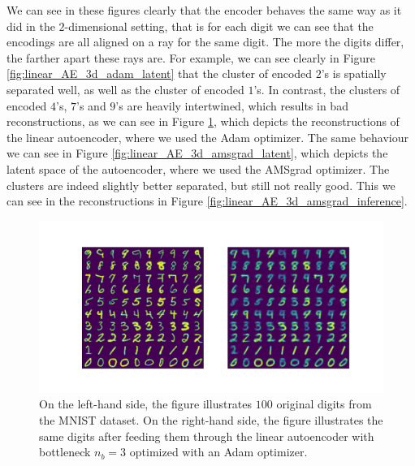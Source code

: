 We can see in these figures clearly that the encoder behaves the same way as it did in the $2$-dimensional setting, that is for each digit we can see that the encodings are all aligned on a ray for the same digit. The more the digits differ, the farther apart these rays are. For example, we can see clearly in Figure \ref{fig:linear_AE_3d_adam_latent} that the cluster of encoded $2$'s is spatially separated well, as well as the cluster of encoded $1$'s. In contrast, the clusters of encoded $4$'s, $7$'s and $9$'s are heavily intertwined, which results in bad reconstructions, as we can see in Figure \ref{fig:linear_AE_3d_adam_inference}, which depicts the reconstructions of the linear autoencoder, where we used the Adam optimizer. The same behaviour we can see in Figure \ref{fig:linear_AE_3d_amsgrad_latent}, which depicts the latent space of the autoencoder, where we used the AMSgrad optimizer. The clusters are indeed slightly better separated, but still not really good. This we can see in the reconstructions in Figure \ref{fig:linear_AE_3d_amsgrad_inference}.

\begin{figure}
\begin{center}
   \begin{minipage}[b]{\linewidth}
      \includegraphics[trim = 15mm 10mm 15mm 15mm, clip, width=\linewidth]{linear_AE_3d_adam_inference}
	\end{minipage}
\end{center}
\caption{On the left-hand side, the figure illustrates $100$ original digits from the MNIST dataset. On the right-hand side, the figure illustrates the same digits after feeding them through the linear autoencoder with bottleneck $n_b=3$ optimized with an Adam optimizer.}\label{fig:linear_AE_3d_adam_inference}
\end{figure}



